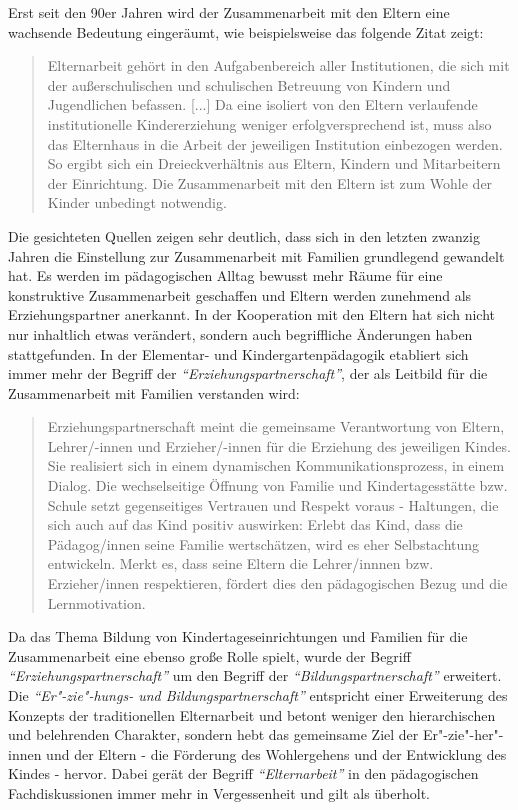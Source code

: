 \documentclass[12pt,a4paper]{article}
\begin{document}
	Erst seit den 90er Jahren wird der Zusammenarbeit mit den Eltern eine wachsende Bedeutung eingeräumt, wie beispielsweise das folgende Zitat zeigt:	
\begin{quote}
\begin{doublespace}
 Elternarbeit gehört in den Aufgabenbereich aller Institutionen, die 	sich mit der	außerschulischen und schulischen Betreuung von 	Kindern und Jugendlichen  befassen. [...] Da eine isoliert von den 	Eltern verlaufende institutionelle Kindererziehung weniger 	erfolgversprechend ist, muss also das Elternhaus in die Arbeit 	der jeweiligen Institution einbezogen werden. So ergibt sich ein 	Dreieckverhältnis aus Eltern, Kindern und Mitarbeitern der 	Einrichtung. Die Zusammenarbeit mit den Eltern ist zum Wohle 	der Kinder unbedingt notwendig.~\parencite[S.~238-239]{Becker}
\end{doublespace}
\end{quote}
Die gesichteten Quellen zeigen sehr deutlich, dass sich in den letzten zwanzig Jahren die Einstellung zur Zusammenarbeit mit Familien grundlegend gewandelt hat. Es werden im pädagogischen Alltag bewusst mehr Räume für eine konstruktive Zusammenarbeit geschaffen und Eltern werden zunehmend als Erziehungspartner anerkannt. In der Kooperation mit den Eltern hat sich nicht nur inhaltlich etwas verändert, sondern auch begriffliche Änderungen haben stattgefunden. In der Elementar- und Kindergartenpädagogik etabliert sich immer mehr der Begriff der \textit{"`Erziehungspartnerschaft"'}, der als Leitbild für die Zusammenarbeit mit Familien verstanden wird:
\begin{quote}
\begin{doublespace}
Erziehungspartnerschaft meint die gemeinsame Verantwortung von Eltern, Lehrer/-innen und Erzieher/-innen für die Erziehung des jeweiligen Kindes. Sie realisiert sich in einem dynamischen Kommunikationsprozess, in einem Dialog. Die wechselseitige Öffnung von Familie und Kindertagesstätte bzw. Schule setzt gegenseitiges Vertrauen und Respekt voraus - Haltungen, die sich auch auf das Kind positiv auswirken: Erlebt das Kind, dass die Pädagog/innen seine Familie wertschätzen, wird es eher Selbstachtung entwickeln. Merkt es, dass seine Eltern die Lehrer/innnen bzw. Erzieher/innen respektieren, fördert dies den pädagogischen Bezug und die Lernmotivation. \parencite{Textor_oJ}
\end{doublespace}
\end{quote}
Da das Thema Bildung von Kindertageseinrichtungen und Familien für die Zusammenarbeit eine ebenso große Rolle spielt, wurde der Begriff \textit{"`Erziehungspartnerschaft"'} um den Begriff der \textit{"`Bildungspartnerschaft"'} erweitert. Die \textit{"`Er"-zie"-hungs- und Bildungspartnerschaft"'} entspricht einer Erweiterung des Konzepts der traditionellen Elternarbeit und betont weniger den hierarchischen und belehrenden Charakter, sondern hebt das gemeinsame Ziel  der Er"-zie"-her"-innen und der Eltern - die Förderung des Wohlergehens und der Entwicklung des Kindes - hervor. Dabei gerät der Begriff \textit{"`Elternarbeit"'} in den pädagogischen Fachdiskussionen immer mehr in Vergessenheit und gilt als überholt.
	
\end{document}
